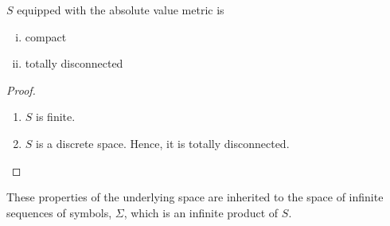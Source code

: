 \documentclass[10pt,twoside]{book}
\begin{document}
\begin{proposition}
  $S$ equipped with the absolute value metric is 
  \begin{enumerate}[(i)]
    \item compact
    \item totally disconnected
  \end{enumerate}
  \begin{proof}
    \begin{enumerate}
      \item
        $S$ is finite.
      \item 
        $S$ is a discrete space.
        Hence, it is totally disconnected.
    \end{enumerate}
  \end{proof}
\end{proposition}
These properties of the underlying space are inherited to the space of infinite sequences of symbols, $\Sigma$, which is an infinite product of $S$.
\end{document}

